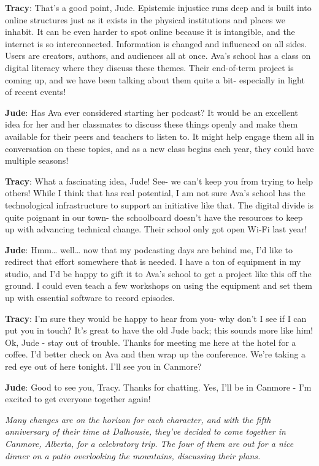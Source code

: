 \documentclass[
  letterpaper,
  DIV=11,
  numbers=noendperiod]{scrreprt}
\begin{document}
\textbf{Tracy}: That's a good point, Jude. Epistemic injustice runs deep
and is built into online structures just as it exists in the physical
institutions and places we inhabit. It can be even harder to spot online
because it is intangible, and the internet is so interconnected.
Information is changed and influenced on all sides. Users are creators,
authors, and audiences all at once. Ava's school has a class on digital
literacy where they discuss these themes. Their end-of-term project is
coming up, and we have been talking about them quite a bit- especially
in light of recent events!

\textbf{Jude}: Has Ava ever considered starting her podcast? It would be
an excellent idea for her and her classmates to discuss these things
openly and make them available for their peers and teachers to listen
to. It might help engage them all in conversation on these topics, and
as a new class begins each year, they could have multiple seasons!

\textbf{Tracy}: What a fascinating idea, Jude! See- we can't keep you
from trying to help others! While I think that has real potential, I am
not sure Ava's school has the technological infrastructure to support an
initiative like that. The digital divide is quite poignant in our town-
the schoolboard doesn't have the resources to keep up with advancing
technical change. Their school only got open Wi-Fi last year!

\textbf{Jude}: Hmm\ldots{} well\ldots{} now that my podcasting days are
behind me, I'd like to redirect that effort somewhere that is needed. I
have a ton of equipment in my studio, and I'd be happy to gift it to
Ava's school to get a project like this off the ground. I could even
teach a few workshops on using the equipment and set them up with
essential software to record episodes.

\textbf{Tracy}: I'm sure they would be happy to hear from you- why don't
I see if I can put you in touch? It's great to have the old Jude back;
this sounds more like him! Ok, Jude - stay out of trouble. Thanks for
meeting me here at the hotel for a coffee. I'd better check on Ava and
then wrap up the conference. We're taking a red eye out of here tonight.
I'll see you in Canmore?

\textbf{Jude}: Good to see you, Tracy. Thanks for chatting. Yes, I'll be
in Canmore - I'm excited to get everyone together again!

\emph{Many changes are on the horizon for each character, and with the
fifth anniversary of their time at Dalhousie, they've decided to come
together in Canmore, Alberta, for a celebratory trip. The four of them
are out for a nice dinner on a patio overlooking the mountains,
discussing their plans.}
\end{document}
